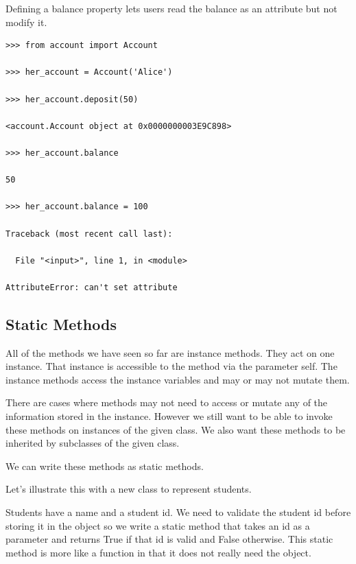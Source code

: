 \documentclass{article}
\begin{document}
Defining  a balance property lets users read the balance as an attribute but not modify it.

\begin{lstlisting}
>>> from account import Account

>>> her_account = Account('Alice')

>>> her_account.deposit(50)

<account.Account object at 0x0000000003E9C898>

>>> her_account.balance

50

>>> her_account.balance = 100

Traceback (most recent call last):

  File "<input>", line 1, in <module>

AttributeError: can't set attribute
\end{lstlisting}

\subsection{Static Methods}

All of the methods we have seen so far are instance methods.  They act on one instance. That instance is accessible to the method via the parameter self.  The instance methods access the instance variables and may or may not mutate them.

There are cases where methods may not need to access or mutate any of the information stored in the instance.  However we still want to be able to invoke these methods on instances of the given class.  We also want these methods to be inherited by subclasses of the given class.

We can write these methods as static methods.  

Let's illustrate this with a new class to represent students.

Students have a name and a student id.  We need to validate the student id before storing it in the object so we write a static method that takes an id as a parameter and returns True if that id is valid and False otherwise.  This static method is more like a function in that it does not really need the object.
\end{document}
